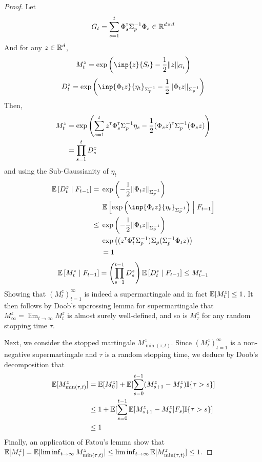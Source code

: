 \documentclass{article}
\begin{document}
\begin{proof}


Let 
\begin{equation*}
    G_t = \sum_{s=1}^t \Phi_s^{\mathsf{\scriptscriptstyle T}} \Sigma_p^{-1} \Phi_s \in \mathbb{R}^{d\times d}
\end{equation*}
And for any $z\in\mathbb{R}^d$,
\begin{equation*}
    M_t^z = \exp{\left(\inp{z}{S_t} - \frac{1}{2}\|z\|_{G_t}\right)}
\end{equation*}
\begin{equation*}
    D_t^z = \exp{\left(\inp{\Phi_t z}{\eta_t}_{\Sigma_p^{-1}} - \frac{1}{2}\|\Phi_t z\|_{\Sigma_p^{-1}}\right)}
\end{equation*}
Then,
\begin{align*}
    M_t^z &= \exp{\left(\sum_{s=1}^t z^{\mathsf{\scriptscriptstyle T}}\Phi_s^{\mathsf{\scriptscriptstyle T}}\Sigma_p^{-1} \eta_s - \frac{1}{2} (\Phi_s z)^{\mathsf{\scriptscriptstyle T}}\Sigma_p^{-1}(\Phi_s z) \right)} \\
    &= \prod_{s=1}^{t} D_s^z
\end{align*}
and using the Sub-Gaussianity of $\eta_t$
\begin{align*}
    \expectedvalue\left[D_t^z \condbar F_{t-1}\right] = {}& \exp{\left(- \frac{1}{2}\|\Phi_t z\|_{\Sigma_p^{-1}}\right)}\\ &\expectedvalue\left[\exp{\left(\inp{\Phi_t z}{\eta_t}_{\Sigma_p^{-1}}\right)} \condbar F_{t-1}\right]  \\
    \leq {} & \exp{\left(- \frac{1}{2}\|\Phi_t z\|_{\Sigma_p^{-1}}\right)}\\
    &\exp{\left((z^\transp \Phi_t^\transp \Sigma_p^{-1})\Sigma_p(\Sigma_p^{-1} \Phi_t z)\right)}\\
    &= 1
\end{align*}
\begin{align*}
    \operatorname*{\mathbb{E}}\left[M_t^z \;\middle|\; F_{t-1}\right] = \left(\prod_{s=1}^{t-1} D_s^z\right) \operatorname*{\mathbb{E}}\left[D_t^z \;\middle|\; F_{t-1}\right] \leq M_{t-1}^z
\end{align*}
Showing that $(M_t^z)_{t=1}^\infty$ is indeed a supermartingale and in fact $\operatorname*{\mathbb{E}}[M_t^z]\leq 1$.
It then follows by Doob's upcrossing lemma for supermartingale that $M_\infty^z = \lim_{t\to\infty} M_t^z$ is almost surely well-defined, and so is $M_\tau^z$ for any random stopping time $\tau$.

Next, we consider the stopped martingale $M_{\min(\tau,t)}^z$. Since 
$(M_t^z)_{t=1}^\infty$ is a non-negative supermartingale and $\tau$ is a random stopping time, we deduce by Doob's decomposition that
\begin{align*}
\operatorname*{\mathbb{E}}[M_{\min(\tau,t)}^z] &= \operatorname*{\mathbb{E}}[M_0^z] + \operatorname*{\mathbb{E}}[\sum_{s=0}^{t-1} (M_{s+1}^z-M_s^z) \mathbb{I}\{\tau>s\}]\\
&\leq 1 + \operatorname*{\mathbb{E}}[\sum_{s=0}^{t-1} \operatorname*{\mathbb{E}}[M_{s+1}^z-M_s^z|F_{s}] \mathbb{I}\{\tau>s\}]\\
&\leq 1
\end{align*}
Finally, an application of Fatou's lemma show that 
$\operatorname*{\mathbb{E}}[M_\tau^z] = \operatorname*{\mathbb{E}}[\liminf_{t\to\infty} M_{\min(\tau,t)}^z] \leq \liminf_{t\to\infty} \operatorname*{\mathbb{E}}[M_{\min(\tau,t)}^z] \leq 1.$


\end{proof}
\end{document}
